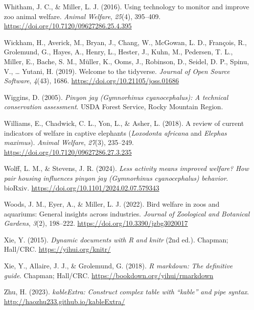 \documentclass[
  pub]{apa6}
\newlength{\cslhangindent}
\newlength{\cslentryspacingunit} %
\newenvironment{CSLReferences}[2] %
 {%
  \setlength{\parindent}{0pt}
  \ifodd #1
  \let\oldpar\par
  \def\par{\hangindent=\cslhangindent\oldpar}
  \fi
  \setlength{\parskip}{#2\cslentryspacingunit}
 }%
 {}
\begin{document}
\begin{CSLReferences}{1}{0}
\leavevmode{}%
Whitham, J. C., \& Miller, L. J. (2016). Using technology to monitor and improve zoo animal welfare. \emph{Animal Welfare}, \emph{25}(4), 395--409. \url{https://doi.org/10.7120/09627286.25.4.395}

\leavevmode{}%
Wickham, H., Averick, M., Bryan, J., Chang, W., McGowan, L. D., François, R., Grolemund, G., Hayes, A., Henry, L., Hester, J., Kuhn, M., Pedersen, T. L., Miller, E., Bache, S. M., Müller, K., Ooms, J., Robinson, D., Seidel, D. P., Spinu, V., \ldots{} Yutani, H. (2019). Welcome to the {tidyverse}. \emph{Journal of Open Source Software}, \emph{4}(43), 1686. \url{https://doi.org/10.21105/joss.01686}

\leavevmode{}%
Wiggins, D. (2005). \emph{Pinyon jay ({Gymnorhinus} cyanocephalus): {A} technical conservation assessment}. {USDA Forest Service, Rocky Mountain Region}.

\leavevmode{}%
Williams, E., Chadwick, C. L., Yon, L., \& Asher, L. (2018). A review of current indicators of welfare in captive elephants (\emph{{Loxodonta} africana} and \emph{{Elephas} maximus}). \emph{Animal Welfare}, \emph{27}(3), 235--249. \url{https://doi.org/10.7120/09627286.27.3.235}

\leavevmode{}%
Wolff, L. M., \& Stevens, J. R. (2024). \emph{Less activity means improved welfare? {How} pair housing influences pinyon jay (\emph{{Gymnorhinus} cyanocephalus}) behavior}. {bioRxiv}. \url{https://doi.org/10.1101/2024.02.07.579343}

\leavevmode{}%
Woods, J. M., Eyer, A., \& Miller, L. J. (2022). Bird welfare in zoos and aquariums: {General} insights across industries. \emph{Journal of Zoological and Botanical Gardens}, \emph{3}(2), 198--222. \url{https://doi.org/10.3390/jzbg3020017}

\leavevmode{}%
Xie, Y. (2015). \emph{Dynamic documents with {R} and knitr} (2nd ed.). Chapman; Hall/CRC. \url{https://yihui.org/knitr/}

\leavevmode{}%
Xie, Y., Allaire, J. J., \& Grolemund, G. (2018). \emph{R markdown: The definitive guide}. Chapman; Hall/CRC. \url{https://bookdown.org/yihui/rmarkdown}

\leavevmode{}%
Zhu, H. (2023). \emph{{kableExtra}: Construct complex table with {``kable''} and pipe syntax}. \url{http://haozhu233.github.io/kableExtra/}

\end{CSLReferences}
\end{document}
